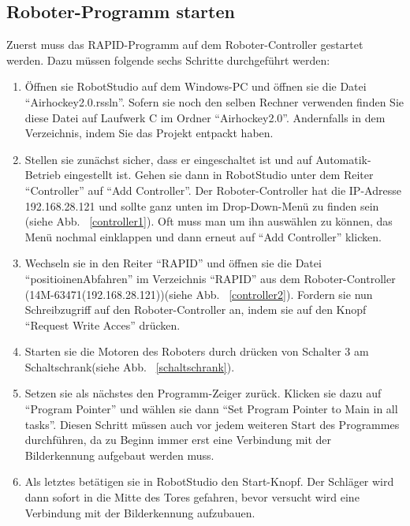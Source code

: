 \subsection{Roboter-Programm starten} 
Zuerst muss das RAPID-Programm auf dem Roboter-Controller gestartet werden. Dazu müssen folgende sechs Schritte durchgeführt werden:  
\begin{enumerate}
\item Öffnen sie RobotStudio auf dem Windows-PC und öffnen sie die Datei \enquote{Airhockey2.0.rssln}. Sofern sie noch den selben Rechner verwenden finden Sie diese Datei auf Laufwerk C im Ordner \enquote{Airhockey2.0}. Andernfalls in dem Verzeichnis, indem Sie das Projekt entpackt haben. 

\item Stellen sie zunächst sicher, dass er eingeschaltet ist und auf Automatik-Betrieb eingestellt ist. Gehen sie dann in RobotStudio unter dem Reiter \enquote{Controller} auf \enquote{Add Controller}. Der Roboter-Controller hat die IP-Adresse 192.168.28.121 und sollte ganz unten im Drop-Down-Menü zu finden sein (siehe Abb. ~\ref{controller1}). Oft muss man um ihn auswählen zu können, das Menü nochmal einklappen und dann erneut auf \enquote{Add Controller} klicken.

\item Wechseln sie in den Reiter \enquote{RAPID} und öffnen sie die Datei \enquote{positioinenAbfahren} im Verzeichnis \enquote{RAPID} aus dem Roboter-Controller (14M-63471(192.168.28.121))(siehe Abb. ~\ref{controller2}). Fordern sie nun Schreibzugriff auf den Roboter-Controller an, indem sie auf den Knopf \enquote{Request Write Acces} drücken. 

\item Starten sie die Motoren des Roboters durch drücken von Schalter 3 am Schaltschrank(siehe Abb. ~\ref{schaltschrank}).

\item Setzen sie als nächstes den Programm-Zeiger zurück. Klicken sie dazu auf \enquote{Program Pointer} und wählen sie dann \enquote{Set Program Pointer to Main in all tasks}. Diesen Schritt müssen auch vor jedem weiteren Start des Programmes durchführen, da zu Beginn immer erst eine Verbindung mit der Bilderkennung aufgebaut werden muss.

\item Als letztes betätigen sie in RobotStudio den Start-Knopf. Der Schläger wird dann sofort in die Mitte des Tores gefahren, bevor versucht wird eine Verbindung mit der Bilderkennung aufzubauen.    
\end{enumerate}

